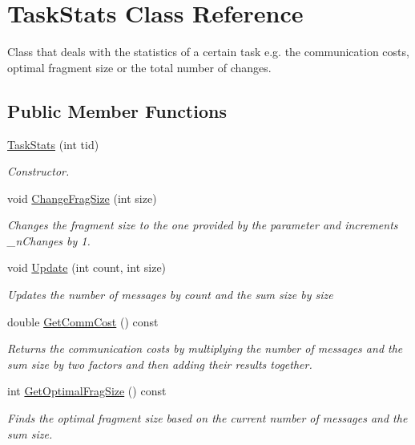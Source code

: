 \hypertarget{class_task_stats}{\section{Task\-Stats Class Reference}
\label{class_task_stats}
}


Class that deals with the statistics of a certain task e.\-g. the communication costs, optimal fragment size or the total number of changes.  


\subsection*{Public Member Functions}
\begin{DoxyCompactItemize}
\item 
\hyperlink{class_task_stats_a4c00d60236fe3dd0a2c1da0f1aa8e8b8}{Task\-Stats} (int tid)
\begin{DoxyCompactList}\small\item\em Constructor. \end{DoxyCompactList}\item 
void \hyperlink{class_task_stats_a758649d8f3437261d21597d2eae4e96c}{Change\-Frag\-Size} (int size)
\begin{DoxyCompactList}\small\item\em Changes the fragment size to the one provided by the parameter and increments \-\_\-n\-Changes by 1. \end{DoxyCompactList}\item 
void \hyperlink{class_task_stats_a2929cead9403326c179e0e5632eb0a6f}{Update} (int count, int size)
\begin{DoxyCompactList}\small\item\em Updates the number of messages by {\itshape count} and the sum size by {\itshape size} \end{DoxyCompactList}\item 
double \hyperlink{class_task_stats_a9b7159820ffada0da0d8c73a4ec16888}{Get\-Comm\-Cost} () const 
\begin{DoxyCompactList}\small\item\em Returns the communication costs by multiplying the number of messages and the sum size by two factors and then adding their results together. \end{DoxyCompactList}\item 
int \hyperlink{class_task_stats_a6a1b62f5be5c194e22e1a335c0c25561}{Get\-Optimal\-Frag\-Size} () const 
\begin{DoxyCompactList}\small\item\em Finds the optimal fragment size based on the current number of messages and the sum size. \end{DoxyCompactList}\item 

\end{DoxyCompactItemize}
